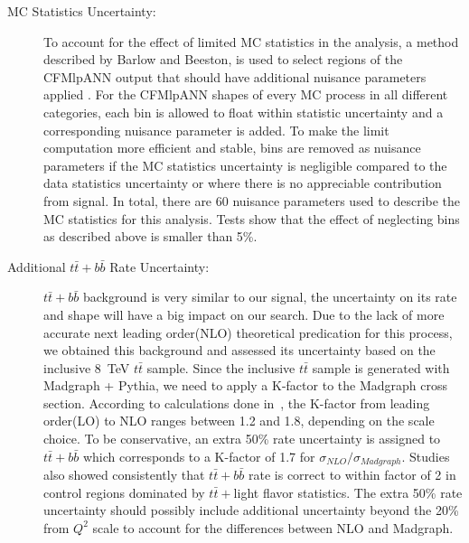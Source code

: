 \begin{description}
  \item[MC Statistics Uncertainty:]  To account for the effect of
    limited MC statistics in the analysis, a method described by
    Barlow and Beeston, is used to select regions of the CFMlpANN
    output that should have additional nuisance parameters applied
    \cite{BarlowBeeston,BarlowBeeston2}. For the CFMlpANN shapes of
    every MC process in all different categories, each bin is allowed
    to float within statistic uncertainty and a corresponding nuisance
    parameter is added. To make the limit computation more efficient
    and stable, bins are removed as nuisance parameters if the MC
    statistics uncertainty is negligible compared to the data
    statistics  uncertainty or where there is no appreciable
    contribution from signal. In total, there are 60 nuisance
    parameters used to describe the MC statistics for this analysis.
    Tests show that the effect of neglecting bins as 
    described above is smaller than 5\%. 

  \item[Additional $t\bar{t}+b\bar{b}$ Rate Uncertainty:]
    $t\bar{t}+b\bar{b}$ background is very similar to our signal, the
    uncertainty on its rate and shape will have a big impact on our
    search. Due to the lack of more accurate next leading order(NLO)
    theoretical predication for this process, we obtained this
    background and assessed its uncertainty based on the inclusive
    8~TeV $t\bar{t}$ sample. Since the inclusive $t\bar{t}$ sample is
    generated with Madgraph + Pythia, we need to apply a K-factor to
    the Madgraph cross section. According to calculations done
    in~\cite{kfactor}, the K-factor from leading order(LO) to NLO
    ranges between 1.2 and 1.8, depending on the scale choice.  To be
    conservative, an extra 50\% rate uncertainty is assigned to
    $t\bar{t}+b\bar{b}$ which corresponds to a K-factor of 1.7 for
    $\sigma_{NLO}/\sigma_{Madgraph}$. Studies also showed consistently
    that $t\bar{t}+b\bar{b}$ rate is correct to within factor of 2 in
    control regions dominated by $t\bar{t}+$light flavor statistics.
    The extra 50\% rate uncertainty should possibly include additional
    uncertainty beyond the 20\% from $Q^{2}$ scale to account for the
    differences between NLO and Madgraph. 


\end{description}

